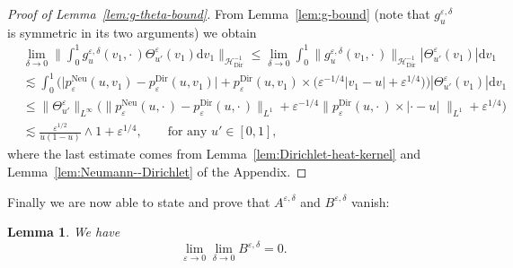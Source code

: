 \documentclass[10pt]{amsart}
\newtheorem{lemm}[theo]{Lemma}\newtheorem{prop}[theo]{Proposition}\newtheorem{coro}[theo]{Corollary}\newtheorem{conj}[theo]{Conjecture}
\theoremstyle{definition}\newtheorem{defi}[theo]{Definition}\newtheorem{rema}[theo]{Remark}\newtheorem{exam}[theo]{Example}\newtheorem{exem}[theo]{Example}\newtheorem{nota}[theo]{Notation}
\DeclareMathOperator{\Dir}{Dir}
\DeclareMathOperator{\Neu}{Neu}
\newcommand{\mc}[1]{{\mathcal #1}}
\renewcommand{\mc}[1]{{\mathcal #1}}
\renewcommand{\leq}{\leqslant}
\newcommand*{\dd}{\mathrm{d}}
\newcommand*{\dv}{\dd v}
\begin{document}
\begin{proof}[Proof of Lemma~\ref{lem:g-theta-bound}]
From Lemma~\ref{lem:g-bound} (note that $g^{\varepsilon, \delta}_u$ is symmetric in its two arguments) we obtain
\begin{align*}
&\lim_{\delta \rightarrow 0} \bigg\| \int_0^1 g^{\varepsilon, \delta}_u (v_1, \cdot\,) \Theta^{\varepsilon}_{u'} (v_1) \dv_1 \bigg\|_{\mc H_{\Dir}^{- 1}} \leq \lim_{\delta \rightarrow 0} \int_0^1 \big\| g^{\varepsilon,
\delta}_u (v_1, \cdot\,) \big\|_{\mc H_{\Dir}^{- 1}} | \Theta^{\varepsilon}_{u'} (v_1) | \dv_1\\
&\lesssim\int_0^1 \Big(\big| p^{\Neu}_{\varepsilon} (u, v_1) - p^{\Dir}_{\varepsilon} (u, v_1) \big| + p^{\Dir}_{\varepsilon} (u, v_1) \times \big(\varepsilon^{- 1/4} | v_1 - u | + \varepsilon^{1/4} \big)\Big) | \Theta^{\varepsilon}_{u'} (v_1) | \dv_1\\
& \leq \| \Theta^{\varepsilon}_{u'} \|_{L^{\infty}} \Big(\big\| p^{\Neu}_{\varepsilon} (u, \cdot\,) - p^{\Dir}_{\varepsilon} (u, \cdot\,)
\big\|_{L^1} + \varepsilon^{- 1/4} \big\| p^{\Dir}_{\varepsilon} (u, \cdot\,) \times |
\cdot - u |\; \big\|_{L^1} + \varepsilon^{1/4}\Big)\\
& \lesssim \frac{\varepsilon^{1/2}}{u (1 - u)} \wedge 1 + \varepsilon^{1/4}, \qquad \text{for any } u' \in [0,1],
\end{align*}
where the last estimate comes from Lemma~\ref{lem:Dirichlet-heat-kernel} and Lemma~\ref{lem:Neumann--Dirichlet} of the Appendix.
\end{proof}

Finally we are now able to state and prove that $A^{\varepsilon,\delta}$ and $B^{\varepsilon, \delta}$ vanish:

\begin{lemm}\label{lem:Bdelta}
We have
\[
\lim_{\varepsilon \rightarrow 0} \lim_{\delta \rightarrow 0} B^{\varepsilon, \delta} = 0.
\]
\end{lemm}
\end{document}
